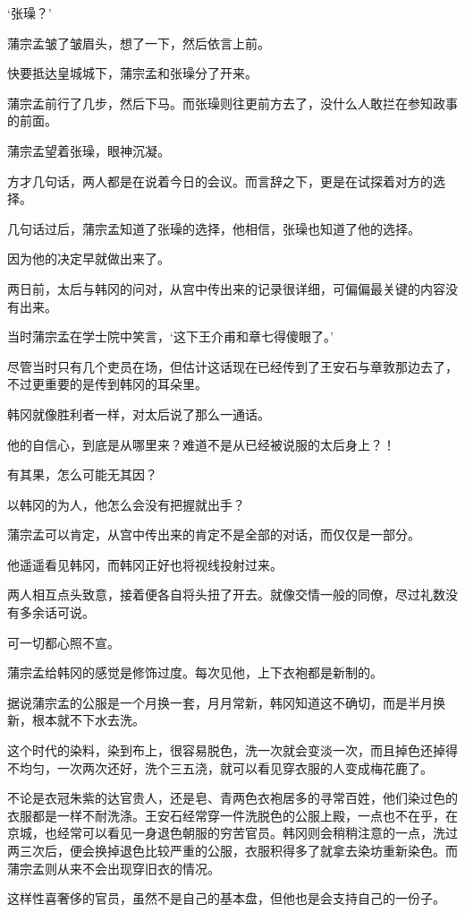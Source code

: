 ‘张璪？’

蒲宗孟皱了皱眉头，想了一下，然后依言上前。

快要抵达皇城城下，蒲宗孟和张璪分了开来。

蒲宗孟前行了几步，然后下马。而张璪则往更前方去了，没什么人敢拦在参知政事的前面。

蒲宗孟望着张璪，眼神沉凝。

方才几句话，两人都是在说着今日的会议。而言辞之下，更是在试探着对方的选择。

几句话过后，蒲宗孟知道了张璪的选择，他相信，张璪也知道了他的选择。

因为他的决定早就做出来了。

两日前，太后与韩冈的问对，从宫中传出来的记录很详细，可偏偏最关键的内容没有出来。

当时蒲宗孟在学士院中笑言，‘这下王介甫和章七得傻眼了。’

尽管当时只有几个吏员在场，但估计这话现在已经传到了王安石与章敦那边去了，不过更重要的是传到韩冈的耳朵里。

韩冈就像胜利者一样，对太后说了那么一通话。

他的自信心，到底是从哪里来？难道不是从已经被说服的太后身上？！

有其果，怎么可能无其因？

以韩冈的为人，他怎么会没有把握就出手？

蒲宗孟可以肯定，从宫中传出来的肯定不是全部的对话，而仅仅是一部分。

他遥遥看见韩冈，而韩冈正好也将视线投射过来。

两人相互点头致意，接着便各自将头扭了开去。就像交情一般的同僚，尽过礼数没有多余话可说。

可一切都心照不宣。

蒲宗孟给韩冈的感觉是修饰过度。每次见他，上下衣袍都是新制的。

据说蒲宗孟的公服是一个月换一套，月月常新，韩冈知道这不确切，而是半月换新，根本就不下水去洗。

这个时代的染料，染到布上，很容易脱色，洗一次就会变淡一次，而且掉色还掉得不均匀，一次两次还好，洗个三五浇，就可以看见穿衣服的人变成梅花鹿了。

不论是衣冠朱紫的达官贵人，还是皂、青两色衣袍居多的寻常百姓，他们染过色的衣服都是一样不耐洗涤。王安石经常穿一件洗脱色的公服上殿，一点也不在乎，在京城，也经常可以看见一身退色朝服的穷苦官员。韩冈则会稍稍注意的一点，洗过两三次后，便会换掉退色比较严重的公服，衣服积得多了就拿去染坊重新染色。而蒲宗孟则从来不会出现穿旧衣的情况。

这样性喜奢侈的官员，虽然不是自己的基本盘，但他也是会支持自己的一份子。

